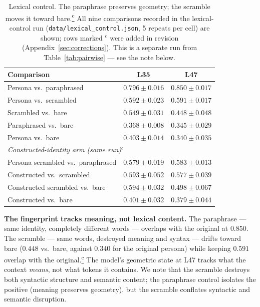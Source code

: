\documentclass[11pt,a4paper]{article}
\newcommand{\corrmark}{\hyperref[sec:corrections]{\textsuperscript{c}}}
\begin{document}
\begin{table}[H]
\centering
\caption{Lexical control. The paraphrase preserves geometry; the
scramble moves it toward bare.\protect\corrmark{} All nine comparisons recorded in the lexical-control
run (\texttt{data/lexical\_control.json}, 5 repeats per cell) are shown;
rows marked $^{c}$ were added in revision (Appendix~\ref{sec:corrections}).
This is a separate run from Table~\ref{tab:pairwise} --- see the note below.}
\label{tab:lexical}
\begin{tabular}{lcc}
\toprule
Comparison & L35 & L47 \\
\midrule
Persona vs.\ paraphrased & $0.796 \pm 0.016$ & $\mathbf{0.850 \pm 0.017}$ \\
Persona vs.\ scrambled & $0.592 \pm 0.023$ & $0.591 \pm 0.017$ \\
Scrambled vs.\ bare & $0.549 \pm 0.031$ & $0.448 \pm 0.048$ \\
Paraphrased vs.\ bare & $0.368 \pm 0.008$ & $0.345 \pm 0.029$ \\
Persona vs.\ bare & $0.403 \pm 0.014$ & $0.340 \pm 0.035$ \\
\midrule
\multicolumn{3}{l}{\emph{Constructed-identity arm (same run)}$^{c}$} \\
Persona scrambled vs.\ paraphrased & $0.579 \pm 0.019$ & $0.583 \pm 0.013$ \\
Constructed vs.\ scrambled & $0.593 \pm 0.052$ & $0.577 \pm 0.039$ \\
Constructed scrambled vs.\ bare & $0.594 \pm 0.032$ & $0.498 \pm 0.067$ \\
Constructed vs.\ bare & $0.401 \pm 0.032$ & $0.379 \pm 0.044$ \\
\bottomrule
\end{tabular}
\end{table}

\textbf{The fingerprint tracks meaning, not lexical content.} The
paraphrase --- same identity, completely different words --- overlaps with
the original at $0.850$. The scramble --- same words, destroyed meaning
and syntax --- drifts toward bare ($0.448$ vs.\ bare, against $0.340$ for
the original persona) while keeping $0.591$ overlap with the original.\corrmark{} The model's
geometric state at L47 tracks what the context \emph{means}, not what
tokens it contains. We note that the scramble destroys both syntactic
structure and semantic content; the paraphrase control isolates the
positive (meaning preserves geometry), but the scramble conflates
syntactic and semantic disruption.
\end{document}
